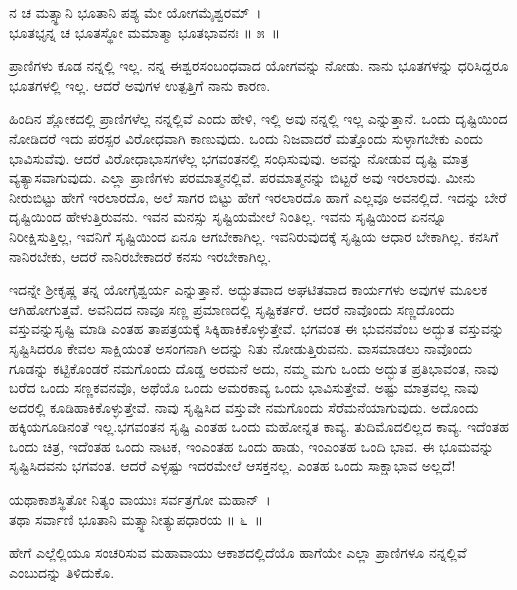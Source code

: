 \begin{shloka}
ನ ಚ ಮತ್ಸ್ಥಾನಿ ಭೂತಾನಿ ಪಶ್ಯ ಮೇ ಯೋಗಮೈಶ್ವರಮ್~।\\ಭೂತಭೃನ್ನ ಚ ಭೂತಸ್ಥೋ ಮಮಾತ್ಮಾ ಭೂತಭಾವನಃ \hfill॥ ೫~॥
\end{shloka}

\begin{artha}
ಪ್ರಾಣಿಗಳು ಕೂಡ ನನ್ನಲ್ಲಿ ಇಲ್ಲ. ನನ್ನ ಈಶ್ವರಸಂಬಂಧವಾದ ಯೋಗವನ್ನು ನೋಡು. ನಾನು ಭೂತಗಳನ್ನು ಧರಿಸಿದ್ದರೂ ಭೂತಗಳಲ್ಲಿ ಇಲ್ಲ. ಆದರೆ ಅವುಗಳ ಉತ್ಪತ್ತಿಗೆ ನಾನು ಕಾರಣ.
\end{artha}

ಹಿಂದಿನ ಶ್ಲೋಕದಲ್ಲಿ ಪ್ರಾಣಿಗಳೆಲ್ಲ ನನ್ನಲ್ಲಿವೆ ಎಂದು ಹೇಳಿ, ಇಲ್ಲಿ ಅವು ನನ್ನಲ್ಲಿ ಇಲ್ಲ ಎನ್ನುತ್ತಾನೆ. ಒಂದು ದೃಷ್ಟಿಯಿಂದ ನೋಡಿದರೆ ಇದು ಪರಸ್ಪರ ವಿರೋಧವಾಗಿ ಕಾಣುವುದು. ಒಂದು ನಿಜವಾದರೆ ಮತ್ತೊಂದು ಸುಳ್ಳಾಗಬೇಕು ಎಂದು ಭಾವಿಸುವೆವು. ಆದರೆ ವಿರೋಧಾಭಾಸಗಳೆಲ್ಲ ಭಗವಂತನಲ್ಲಿ ಸಂಧಿಸುವುವು. ಅವನ್ನು ನೋಡುವ ದೃಷ್ಟಿ ಮಾತ್ರ ವ್ಯತ್ಯಾಸವಾಗುವುದು. ಎಲ್ಲಾ ಪ್ರಾಣಿಗಳು ಪರಮಾತ್ಮನಲ್ಲಿವೆ. ಪರಮಾತ್ಮನನ್ನು ಬಿಟ್ಟರೆ ಅವು ಇರಲಾರವು. ಮೀನು ನೀರುಬಿಟ್ಟು ಹೇಗೆ ಇರಲಾರದೊ, ಅಲೆ ಸಾಗರ ಬಿಟ್ಟು ಹೇಗೆ ಇರಲಾರದೊ ಹಾಗೆ ಎಲ್ಲವೂ ಅವನಲ್ಲಿದೆ. ಇದನ್ನು ಬೇರೆ ದೃಷ್ಟಿಯಿಂದ ಹೇಳುತ್ತಿರುವನು. ಇವನ ಮನಸ್ಸು ಸೃಷ್ಟಿಯಮೇಲೆ ನಿಂತಿಲ್ಲ. ಇವನು ಸೃಷ್ಟಿಯಿಂದ ಏನನ್ನೂ ನಿರೀಕ್ಷಿಸುತ್ತಿಲ್ಲ, ಇವನಿಗೆ ಸೃಷ್ಟಿಯಿಂದ ಏನೂ ಆಗಬೇಕಾಗಿಲ್ಲ. ಇವನಿರುವುದಕ್ಕೆ ಸೃಷ್ಟಿಯ ಆಧಾರ ಬೇಕಾಗಿಲ್ಲ. ಕನಸಿಗೆ ನಾನಿರಬೇಕು, ಆದರೆ ನಾನಿರಬೇಕಾದರೆ ಕನಸು ಇರಬೇಕಾಗಿಲ್ಲ.

ಇದನ್ನೇ ಶ‍್ರೀಕೃಷ್ಣ ತನ್ನ ಯೋಗೈಶ್ವರ್ಯ ಎನ್ನುತ್ತಾನೆ. ಅದ್ಭುತವಾದ ಅಘಟಿತವಾದ ಕಾರ್ಯಗಳು ಅವುಗಳ ಮೂಲಕ ಆಗಿಹೋಗುತ್ತವೆ. ಅವನಿದದ ನಾವೂ ಸಣ್ಣ ಪ್ರಮಾಣದಲ್ಲಿ ಸೃಷ್ಟಿಕರ್ತರೆ. ಆದರೆ ನಾವೊಂದು ಸಣ್ಣದೊಂದು ವಸ್ತುವನ್ನುಸೃಷ್ಟಿ ಮಾಡಿ ಎಂತಹ ತಾಪತ್ರಯಕ್ಕೆ ಸಿಕ್ಕಿಹಾಕಿಕೊಳ್ಳುತ್ತೇವೆ. ಭಗವಂತ ಈ ಭುವನವೆಂಬ ಅದ್ಭುತ ವಸ್ತುವನ್ನು ಸೃಷ್ಟಿಸಿದರೂ ಕೇವಲ ಸಾಕ್ಷಿಯಂತೆ ಅಸಂಗನಾಗಿ ಅದನ್ನು ನಿತು ನೋಡುತ್ತಿರುವನು. ವಾಸಮಾಡಲು ನಾವೊಂದು ಗೂಡನ್ನು ಕಟ್ಟಿಕೊಂಡರೆ ನಮಗೊಂದು ದೊಡ್ಡ ಅರಮನೆ ಅದು, ನಮ್ಮ ಮಗು ಒಂದು ಅದ್ಭುತ ಪ್ರತಿಭಾವಂತ, ನಾವು ಬರೆದ ಒಂದು ಸಣ್ಣಕವನವೊ, ಅಥೆಯೊ ಒಂದು ಅಮರಕಾವ್ಯ ಒಂದು ಭಾವಿಸುತ್ತೇವೆ. ಅಷ್ಟು ಮಾತ್ರವಲ್ಲ ನಾವು ಅದರಲ್ಲಿ ಕೂಡಿಹಾಕಿಕೊಳ್ಳುತ್ತೇವೆ. ನಾವು ಸೃಷ್ಟಿಸಿದ ವಸ್ತುವೇ ನಮಗೊಂದು ಸೆರೆಮನೆಯಾಗುವುದು. ಅದೊಂದು ಹಕ್ಕಿಯಗೂಡಿನಂತೆ ಇಲ್ಲ.\break ಭಗವಂತನ ಸೃಷ್ಟಿ ಎಂತಹ ಒಂದು ಮಹೋನ್ನತ ಕಾವ್ಯ. ತುದಿಮೊದಲಿಲ್ಲದ ಕಾವ್ಯ. ಇದೆಂತಹ ಒಂದು ಚಿತ್ರ, ಇದೆಂತಹ ಒಂದು ನಾಟಕ, ಇಂಎಂತಹ ಒಂದು ಹಾಡು, ಇಂಎಂತಹ ಒಂದಿ ಭಾವ. ಈ ಭೂಮವನ್ನು ಸೃಷ್ಟಿಸಿದವನು ಭಗವಂತ. ಆದರೆ ಎಳ್ಳಷ್ಟು ಇದರಮೇಲೆ ಆಸಕ್ತನಲ್ಲ. ಎಂತಹ ಒಂದು ಸಾಕ್ಷಾಭಾವ ಅಲ್ಲದೆ!

\begin{shloka}
ಯಥಾಕಾಶಸ್ಥಿತೋ ನಿತ್ಯಂ ವಾಯುಃ ಸರ್ವತ್ರಗೋ ಮಹಾನ್~।\\ತಥಾ ಸರ್ವಾಣಿ ಭೂತಾನಿ ಮತ್ಸ್ಥಾನೀತ್ಯುಪಧಾರಯ \hfill॥ ೬~॥
\end{shloka}

\begin{artha}
ಹೇಗೆ ಎಲ್ಲೆಲ್ಲಿಯೂ ಸಂಚರಿಸುವ ಮಹಾವಾಯು ಆಕಾಶದಲ್ಲಿದೆಯೊ ಹಾಗೆಯೇ ಎಲ್ಲಾ ಪ್ರಾಣಿಗಳೂ ನನ್ನಲ್ಲಿವೆ ಎಂಬುದನ್ನು ತಿಳಿದುಕೊ.
\end{artha}

